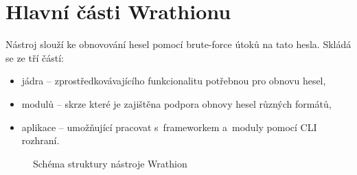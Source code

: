 \section{Hlavní části Wrathionu}
Nástroj slouží ke obnovování hesel pomocí brute-force útoků na tato hesla. Skládá se ze tří
částí:
\begin{itemize}
	\item jádra -- zprostředkovávajícího funkcionalitu potřebnou pro obnovu hesel,
	\item modulů -- skrze které je zajištěna podpora obnovy hesel různých formátů,
	\item aplikace -- umožňující pracovat s~frameworkem a~moduly pomocí CLI rozhraní.
\end{itemize}
\begin{figure}[ht]
    \begin{center}
    \end{center}
    \caption{Schéma struktury nástroje Wrathion \cite{Hranicky}}
    \label{memory}
\end{figure}
